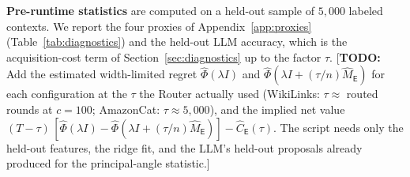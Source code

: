 \documentclass{article}
\theoremstyle{definition}
\theoremstyle{remark}
\theoremstyle{remark}
\newcommand{\todo}[1]{\textcolor{red!70!black}{[\textbf{TODO:} #1]}}
\newcommand{\Exp}{\mathsf{E}}
\begin{document}
\textbf{Pre-runtime statistics} are computed on a held-out sample of
$5{,}000$ labeled contexts. We report the four proxies of Appendix~\ref{app:proxies}
(Table~\ref{tab:diagnostics}) and the held-out LLM accuracy, which is the
acquisition-cost term of Section~\ref{sec:diagnostics} up to the factor
$\tau$. \todo{Add the estimated width-limited regret $\widehat\Phi(\lambda I)$
and $\widehat\Phi(\lambda I+(\tau/n)\widehat M_{\Exp})$ for each configuration
at the $\tau$ the Router actually used (WikiLinks: $\tau\approx$ routed rounds
at $c=100$; AmazonCat: $\tau\approx5{,}000$), and the implied net value
$(T-\tau)\,[\widehat\Phi(\lambda I)-\widehat\Phi(\lambda I+(\tau/n)\widehat M_{\Exp})]-\widehat C_{\Exp}(\tau)$.
The script needs only the held-out features, the ridge fit, and the LLM's
held-out proposals already produced for the principal-angle statistic.}
\end{document}
